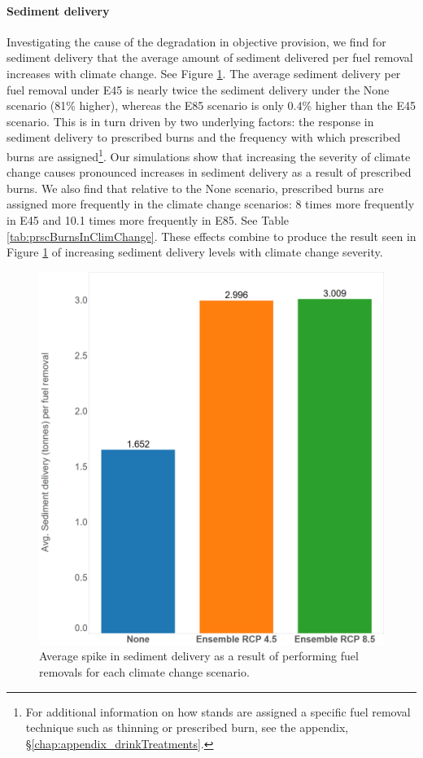 \paragraph{Sediment delivery}
Investigating the cause of the degradation in objective provision, we find for sediment delivery that the average amount of sediment delivered per fuel removal increases with climate change. See Figure \ref{fig:avgSedimentDelivery}. The average sediment delivery per fuel removal under E45 is nearly twice the sediment delivery under the None scenario (81\% higher), whereas the E85 scenario is only 0.4\% higher than the E45 scenario. This is in turn driven by two underlying factors: the response in sediment delivery to prescribed burns and the frequency with which prescribed burns are assigned\footnote{For additional information on how stands are assigned a specific fuel removal technique such as thinning or prescribed burn, see the appendix, \S \ref{chap:appendix_drinkTreatments}.}. Our simulations show that increasing the severity of climate change causes pronounced increases in sediment delivery as a result of prescribed burns. We also find that relative to the None scenario, prescribed burns are assigned more frequently in the climate change scenarios: 8 times more frequently in E45 and 10.1 times more frequently in E85. See Table \ref{tab:prscBurnsInClimChange}. These effects combine to produce the result seen in Figure \ref{fig:avgSedimentDelivery} of increasing sediment delivery levels with climate change severity.

\begin{figure}[ht]
\centering
\includegraphics[width=.55\textwidth]{../images/AvgSedimentSpikes}
\caption[Average sediment delivery across climate scenarios]{Average spike in sediment delivery as a result of performing fuel removals for each climate change scenario.}
\label{fig:avgSedimentDelivery}
\end{figure}

